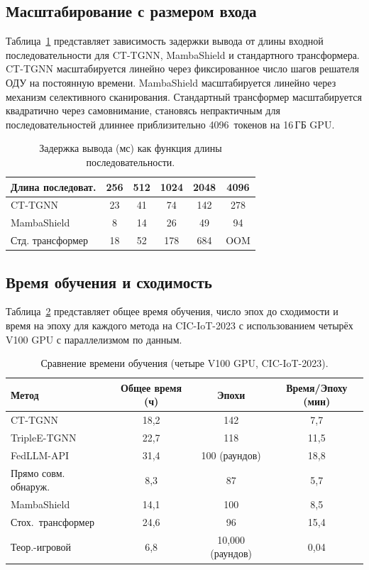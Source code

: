\subsection{Масштабирование с размером входа}
\label{app:scaling}

Таблица~\ref{tab:app_scaling} представляет зависимость задержки вывода от длины входной последовательности для CT-TGNN, MambaShield и стандартного трансформера. CT-TGNN масштабируется линейно через фиксированное число шагов решателя ОДУ на постоянную времени. MambaShield масштабируется линейно через механизм селективного сканирования. Стандартный трансформер масштабируется квадратично через самовнимание, становясь непрактичным для последовательностей длиннее приблизительно 4096~токенов на 16\,ГБ GPU.

\begin{table}[htbp]
\centering
\caption{Задержка вывода (мс) как функция длины последовательности.}
\label{tab:app_scaling}
\begin{tabular}{lccccc}
\toprule
Длина последоват. & 256 & 512 & 1024 & 2048 & 4096 \\
\midrule
CT-TGNN          & 23 & 41 & 74 & 142 & 278 \\
MambaShield      & 8  & 14 & 26 & 49  & 94  \\
Стд. трансформер  & 18 & 52 & 178 & 684 & OOM \\
\bottomrule
\end{tabular}
\end{table}


\subsection{Время обучения и сходимость}
\label{app:training_time}

Таблица~\ref{tab:app_training} представляет общее время обучения, число эпох до сходимости и время на эпоху для каждого метода на CIC-IoT-2023 с использованием четырёх V100 GPU с параллелизмом по данным.

\begin{table}[htbp]
\centering
\caption{Сравнение времени обучения (четыре V100 GPU, CIC-IoT-2023).}
\label{tab:app_training}
\begin{tabular}{lccc}
\toprule
Метод & Общее время (ч) & Эпохи & Время/Эпоху (мин) \\
\midrule
CT-TGNN            & 18,2 & 142 & 7,7 \\
TripleE-TGNN       & 22,7 & 118 & 11,5 \\
FedLLM-API         & 31,4 & 100 (раундов) & 18,8 \\
Прямо совм. обнаруж. & 8,3  & 87  & 5,7 \\
MambaShield        & 14,1 & 100 & 8,5 \\
Стох.\ трансформер  & 24,6 & 96  & 15,4 \\
Теор.-игровой      & 6,8  & 10{,}000 (раундов) & 0,04 \\
\bottomrule
\end{tabular}
\end{table}


